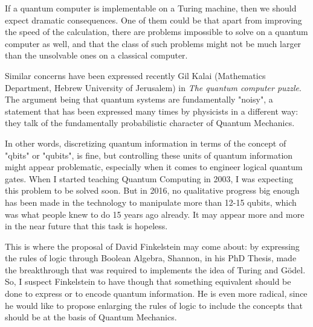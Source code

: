     If a quantum computer is implementable on a Turing machine, then we should
    expect dramatic consequences. One of them could be that apart from improving
    the speed of the calculation, there are problems impossible to solve on a
    quantum computer as well, and that the class of such problems might not be
    much larger than the unsolvable ones on a classical computer.


    Similar concerns have been expressed recently Gil Kalai
    (Mathematics Department, Hebrew University of Jerusalem) in {\em The
    quantum computer puzzle}. The argument being that quantum systems are
    fundamentally "noisy", a statement that has been expressed many times
    by physicists in a different way: they talk of the fundamentally
    probabilistic character of Quantum Mechanics.


    In other words, discretizing quantum information in terms of the concept of
    "qbits" or "qubits", is fine, but controlling these units of quantum
    information might appear problematic, especially when it comes to
    engineer logical quantum gates. When I started teaching Quantum Computing in
    2003, I was expecting this problem to be solved soon. But in 2016, no
    qualitative progress big enough has been made in the technology
    to manipulate more than 12-15 qubits, which was what people knew to do 15
    years ago already. It may appear more and more in the near future that this
    task is hopeless.


    This is where the proposal of David Finkelstein may come about: by
    expressing the rules of logic through Boolean Algebra, Shannon, in his PhD
    Thesis, made the breakthrough that was required to implements the idea of
    Turing and G\"odel. So, I suspect Finkelstein to have though that something
    equivalent should be done to express or to encode quantum information.  He
    is even more radical, since he would like to propose enlarging the rules of
    logic to include the concepts that should be at the basis of Quantum
    Mechanics.


